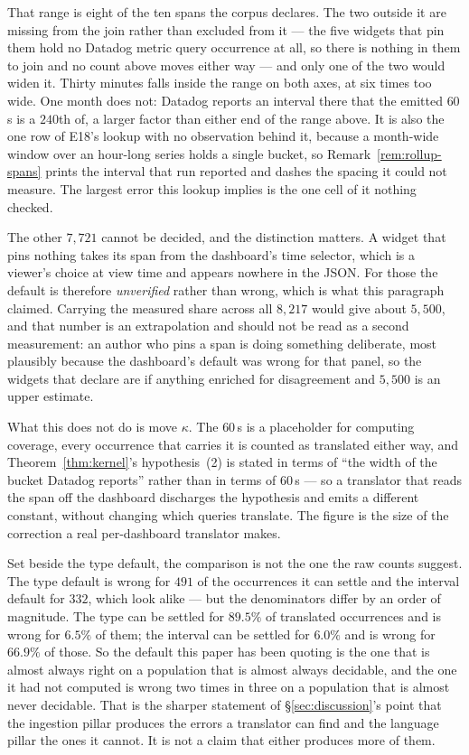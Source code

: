 That range is eight of the ten spans the corpus declares. The two outside it are missing
from the join rather than excluded from it --- the five widgets that pin them hold no
Datadog metric query occurrence at all, so there is nothing in them to join and no count
above moves either way --- and only one of the two would widen it. Thirty minutes falls
inside the range on both axes, at six times too wide. One month does not: Datadog reports
an interval there that the emitted $60$\,s is a $240$th of, a larger factor than either
end of the range above. It is also the one row of E18's lookup with no observation behind
it, because a month-wide window over an hour-long series holds a single bucket, so
Remark~\ref{rem:rollup-spans} prints the interval that run reported and dashes the
spacing it could not measure. The largest error this lookup implies is the one cell of it
nothing checked.

The other $7{,}721$ cannot be decided, and the distinction matters. A widget that pins
nothing takes its span from the dashboard's time selector, which is a viewer's choice at
view time and appears nowhere in the JSON. For those the default is therefore
\emph{unverified} rather than wrong, which is what this paragraph claimed. Carrying the
measured share across all $8{,}217$ would give about $5{,}500$, and that number is an
extrapolation and should not be read as a second measurement: an author who pins a span
is doing something deliberate, most plausibly because the dashboard's default was wrong
for that panel, so the widgets that declare are if anything enriched for disagreement
and $5{,}500$ is an upper estimate.

What this does not do is move $\kappa$. The $60$\,s is a placeholder for computing
coverage, every occurrence that carries it is counted as translated either way, and
Theorem~\ref{thm:kernel}'s hypothesis~(2) is stated in terms of ``the width of the
bucket Datadog reports'' rather than in terms of $60$\,s --- so a translator that reads
the span off the dashboard discharges the hypothesis and emits a different constant,
without changing which queries translate. The figure is the size of the correction a
real per-dashboard translator makes.

Set beside the type default, the comparison is not the one the raw counts suggest. The
type default is wrong for $491$ of the occurrences it can settle and the interval default
for $332$, which look alike --- but the denominators differ by an order of magnitude. The
type can be settled for $89.5\%$ of translated occurrences and is wrong for $6.5\%$ of
them; the interval can be settled for $6.0\%$ and is wrong for $66.9\%$ of those. So the
default this paper has been quoting is the one that is almost always right on a
population that is almost always decidable, and the one it had not computed is wrong two
times in three on a population that is almost never decidable. That is the sharper
statement of \S\ref{sec:discussion}'s point that the ingestion pillar produces the
errors a translator can find and the language pillar the ones it cannot. It is not a
claim that either produces more of them.

